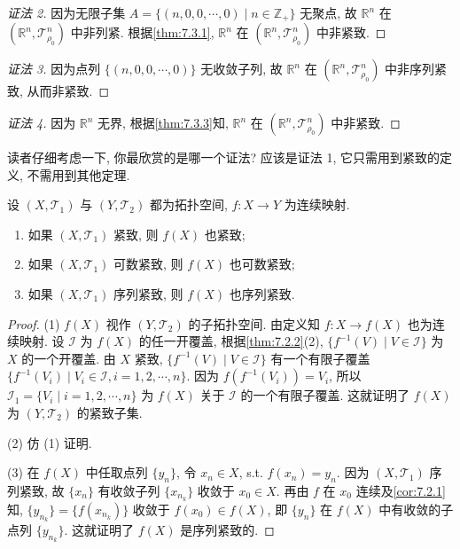 \begin{proof}[证法 2]
因为无限子集 $A = \{(n, 0, 0, \cdots, 0) \mid n \in \mathbb{Z}_{+}\}$ 无聚点, 故 $\mathbb{R}^{n}$ 在 $(\mathbb{R}^{n}, \mathcal{T}_{\rho_{0}}^{n})$ 中非列紧. 根据\cref{thm:7.3.1}, $\mathbb{R}^{n}$ 在 $(\mathbb{R}^{n}, \mathcal{T}_{\rho_{0}}^{n})$ 中非紧致.
\end{proof}

\begin{proof}[证法 3]
因为点列 $\{(n, 0, 0, \cdots, 0)\}$ 无收敛子列, 故 $\mathbb{R}^{n}$ 在 $(\mathbb{R}^{n}, \mathcal{T}_{\rho_{0}}^{n})$ 中非序列紧致, 从而非紧致.
\end{proof}

\begin{proof}[证法 4]
因为 $\mathbb{R}^{n}$ 无界, 根据\cref{thm:7.3.3}知, $\mathbb{R}^{n}$ 在 $(\mathbb{R}^{n}, \mathcal{T}_{\rho_{0}}^{n})$ 中非紧致.
\end{proof}

读者仔细考虑一下, 你最欣赏的是哪一个证法? 应该是证法 1, 它只需用到紧致的定义, 不需用到其他定理.

\begin{theorem}\label{thm:7.3.7}
设 $(X, \mathcal{T}_{1})$ 与 $(Y, \mathcal{T}_{2})$ 都为拓扑空间, $f\colon X \to Y$ 为连续映射.
\begin{enumerate}
  \item 如果 $(X, \mathcal{T}_{1})$ 紧致, 则 $f(X)$ 也紧致;

  \item 如果 $(X, \mathcal{T}_{1})$ 可数紧致, 则 $f(X)$ 也可数紧致;

  \item 如果 $(X, \mathcal{T}_{1})$ 序列紧致, 则 $f(X)$ 也序列紧致.
\end{enumerate}
\end{theorem}

\begin{proof}
(1) $f(X)$ 视作 $(Y, \mathcal{T}_{2})$ 的子拓扑空间. 由定义知 $f\colon X \to f(X)$ 也为连续映射. 设 $\mathcal{I}$ 为 $f(X)$ 的任一开覆盖, 根据\cref{thm:7.2.2}(2), $\{f^{-1}(V) \mid V \in \mathcal{I}\}$ 为 $X$ 的一个开覆盖. 由 $X$ 紧致, $\{f^{-1}(V) \mid V \in \mathcal{I}\}$ 有一个有限子覆盖 $\{f^{-1}(V_{i}) \mid V_{i} \in \mathcal{I}, i = 1, 2, \cdots, n\}$. 因为 $f(f^{-1}(V_{i})) = V_{i}$, 所以 $\mathcal{I}_{1} = \{V_{i} \mid i = 1, 2, \cdots, n\}$ 为 $f(X)$ 关于 $\mathcal{I}$ 的一个有限子覆盖. 这就证明了 $f(X)$ 为 $(Y, \mathcal{T}_{2})$ 的紧致子集.

(2) 仿 (1) 证明.

(3) 在 $f(X)$ 中任取点列 $\{y_{n}\}$, 令 $x_{n} \in X$, s.t. $f(x_{n}) = y_{n}$. 因为 $(X, \mathcal{T}_{1})$ 序列紧致, 故 $\{x_{n}\}$ 有收敛子列 $\{x_{n_{k}}\}$ 收敛于 $x_{0} \in X$. 再由 $f$ 在 $x_{0}$ 连续及\cref{cor:7.2.1}知, $\{y_{n_{k}}\} = \{f(x_{n_{k}})\}$ 收敛于 $f(x_{0}) \in f(X)$, 即 $\{y_{n}\}$ 在 $f(X)$ 中有收敛的子点列 $\{y_{n_{k}}\}$. 这就证明了 $f(X)$ 是序列紧致的.
\end{proof}

